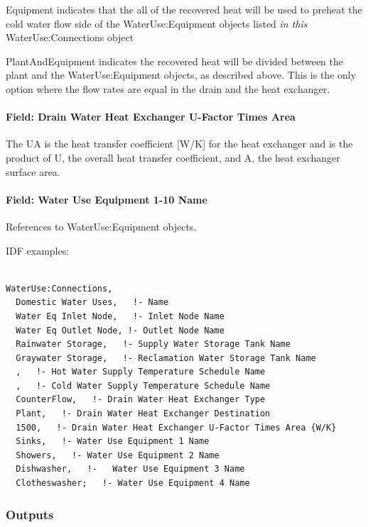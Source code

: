 Equipment indicates that the all of the recovered heat will be used to preheat the cold water flow side of the WaterUse:Equipment objects listed \emph{in this} WaterUse:Connections object

PlantAndEquipment indicates the recovered heat will be divided between the plant and the WaterUse:Equipment objects, as described above. This is the only option where the flow rates are equal in the drain and the heat exchanger.

\paragraph{Field: Drain Water Heat Exchanger U-Factor Times Area}\label{field-drain-water-heat-exchanger-u-factor-times-area}

The UA is the heat transfer coefficient {[}W/K{]} for the heat exchanger and is the product of U, the overall heat transfer coefficient, and A, the heat exchanger surface area.

\paragraph{Field: Water Use Equipment 1-10 Name}\label{field-water-use-equipment-1-10-name}

References to WaterUse:Equipment objects.

IDF examples:

\begin{lstlisting}

WaterUse:Connections,
  Domestic Water Uses,   !- Name
  Water Eq Inlet Node,   !- Inlet Node Name
  Water Eq Outlet Node, !- Outlet Node Name
  Rainwater Storage,   !- Supply Water Storage Tank Name
  Graywater Storage,   !- Reclamation Water Storage Tank Name
  ,   !- Hot Water Supply Temperature Schedule Name
  ,   !- Cold Water Supply Temperature Schedule Name
  CounterFlow,   !- Drain Water Heat Exchanger Type
  Plant,   !- Drain Water Heat Exchanger Destination
  1500,   !- Drain Water Heat Exchanger U-Factor Times Area {W/K}
  Sinks,   !- Water Use Equipment 1 Name
  Showers,   !- Water Use Equipment 2 Name
  Dishwasher,   !-   Water Use Equipment 3 Name
  Clotheswasher;   !- Water Use Equipment 4 Name
\end{lstlisting}

\subsubsection{Outputs}\label{outputs-1-031}


